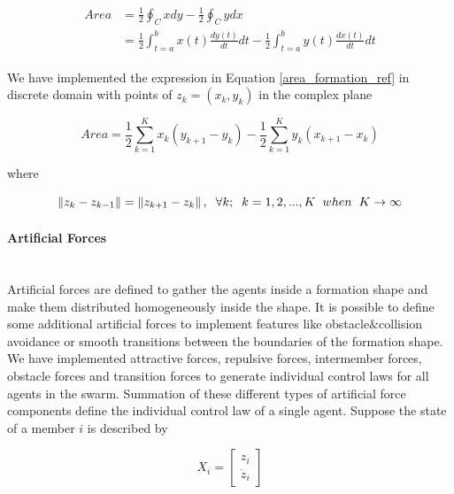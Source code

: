 \begin{align} \label{area_formation_ref}
\begin{split}
Area &= \frac{1}{2} \oint_C xdy - \frac{1}{2} \oint_C ydx \\
&= \frac{1}{2} \int_{t=a}^{b} x(t)\frac{dy(t)}{dt}dt - \frac{1}{2} \int_{t=a}^{b}y(t)\frac{dx(t)}{dt}dt
\end{split}
\end{align}
		
We have implemented the expression in Equation \ref{area_formation_ref} in discrete domain with points of  $z_k = (x_k,y_k)$ in the complex plane
			
\begin{equation}
Area = \frac{1}{2} \sum_{k=1}^{K} x_k(y_{k+1} - y_k) - \frac{1}{2} \sum_{k=1}^{K}y_k(x_{k+1} - x_k)
\end{equation}
			
where

\begin{equation}
\left\lVert z_k - z_{k-1}\right\rVert = \left\lVert z_{k+1} - z_k\right\rVert, \hspace{0.2cm}  \forall k ;  \hspace{0.2cm} k=1,2,...,K \hspace{0.2cm} when  \hspace{0.2cm} K \to\infty
\end{equation}

\paragraph{Artificial Forces}\hspace{0pt} \\ 
Artificial forces are defined to gather the agents inside a formation shape and make them distributed homogeneously inside the shape. It is possible to define some additional artificial forces to implement features like obstacle$\&$collision avoidance or smooth transitions between the boundaries of the formation shape. We have implemented attractive forces, repulsive forces, intermember forces, obstacle forces and transition forces to generate individual control laws for all agents in the swarm. Summation of these different types of artificial force components define the individual control law of a single agent. Suppose the state of a member $i$ is described by

\begin{equation}
X_i = \begin{bmatrix}
z_i\\ \dot{z}_i
\end{bmatrix}
\end{equation}

